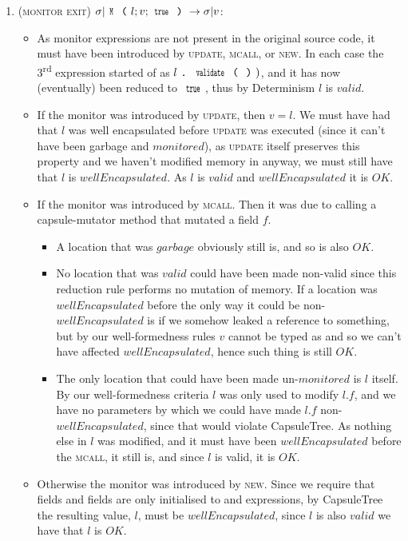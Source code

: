 \begin{enumerate}
\item (\textsc{monitor exit}) $\sigma|\Kw{M}\oR l; v;\Kw{true}\cR\rightarrow \sigma|v$:
\begin{itemize}
	\item As monitor expressions are not present in the original source code, it must have been introduced by \textsc{update}, \textsc{mcall}, or \textsc{new}. In each case the 3\textsuperscript{rd} expression started of as $l\singleDot\Kw{validate}\oR\cR)$, and it has now (eventually) been reduced to $\Kw{true}$, thus by Determinism $l$ is $valid$.

	\item  If the monitor was introduced by \textsc{update}, then $v = l$. We must have had that $l$ was well encapsulated before \textsc{update} was executed (since it can’t have been garbage and $monitored$), as \textsc{update} itself preserves this property and we haven’t modified memory in anyway, we must still have that $l$ is $wellEncapsulated$. As $l$ is $valid$ and $wellEncapsulated$ it is $OK$.

	\item If the monitor was introduced by \textsc{mcall}. Then it was due to calling a capsule-mutator method that mutated a field $f$.
	\begin{itemize}
		\item A location that was $garbage$ obviously still is, and so is also $OK$.
		\item No location that was $valid$ could have been made non-valid since this reduction rule performs no mutation of memory. If a location was $wellEncapsulated$ before the only way it could be non-$wellEncapsulated$ is if we somehow leaked a \Q@mut@ reference to something, but by our well-formedness rules $v$ cannot be typed as \Q@mut@ and so we can’t have affected $wellEncapsulated$, hence such thing is still $OK$.
		\item The only location that could have been made un-$monitored$ is $l$ itself. By our well-formedness criteria $l$ was only used to modify $l.f$, and we have no parameters by which we could have made $l.f$ non-$wellEncapsulated$, since that would violate CapsuleTree. As nothing else in $l$ was modified, and it must have been $wellEncapsulated$ before the \textsc{mcall}, it still is, and since  $l$ is valid, it is $OK$.
	\end{itemize}
	\item Otherwise the monitor was introduced by \textsc{new}. Since we require that \Q@capsule@ fields and \Q@imm@ fields are only initialised to \Q@capsule@ and \Q@imm@ expressions, by CapsuleTree the resulting value, $l$, must be $wellEncapsulated$, since $l$ is also $valid$ we have that $l$ is $OK$.


\end{itemize}
\end{enumerate}
